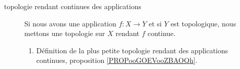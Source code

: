 \begin{description}
\begin{enumerate}
		\end{enumerate}
	\item[topologie rendant continues des applications]
		Si nous avons une application \( f\colon X\to Y\) et si \( Y\) est topologique, nous mettons une topologie sur \( X\) rendant \( f\) continue.
		\begin{enumerate}
			\item
			      Définition de la plus petite topologie rendant des applications continues, proposition \ref{PROPooGOEVooZBAOQh}.
		\end{enumerate}
\end{description}

